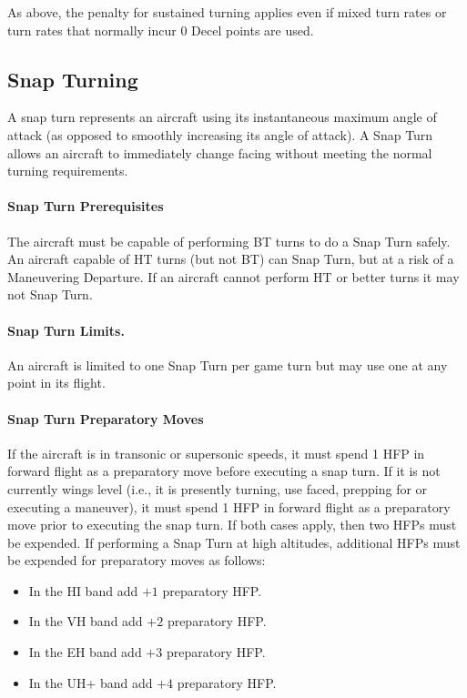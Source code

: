 As above, the penalty for sustained turning applies even if mixed turn rates or turn rates that normally incur 0 Decel points are used.

\subsection{Snap Turning}


A snap turn represents an aircraft using its instantaneous maximum angle of attack (as opposed to smoothly increasing its angle of attack). A Snap Turn allows an aircraft to immediately change facing without meeting the normal turning requirements.

\paragraph{Snap Turn Prerequisites} The aircraft must be capable of performing BT turns to do a Snap Turn safely. An aircraft capable of HT turns (but not BT) can Snap Turn, but at a risk of a Maneuvering Departure. If an aircraft cannot perform HT or better turns it may not Snap Turn.

\paragraph{Snap Turn Limits.} An aircraft is limited to one Snap Turn per game turn but may use one at any point in its flight.

\paragraph{Snap Turn Preparatory Moves} If the aircraft is in transonic or supersonic speeds, it must spend 1 HFP in forward flight as a preparatory move before executing a snap turn. If it is not currently wings level (i.e., it is presently turning, use faced, prepping for or executing a maneuver), it must spend 1 HFP in forward flight as a preparatory move prior to executing the snap turn. If both cases apply, then two HFPs must be expended. If performing a Snap Turn at high altitudes, additional HFPs must be expended for preparatory moves as follows:

\begin{itemize}
    \item In the HI band add $+1$ preparatory HFP.
    \item In the VH band add $+2$ preparatory HFP.
    \item In the EH band add $+3$ preparatory HFP.
    \item In the UH+ band add $+4$ preparatory HFP.
\end{itemize}

